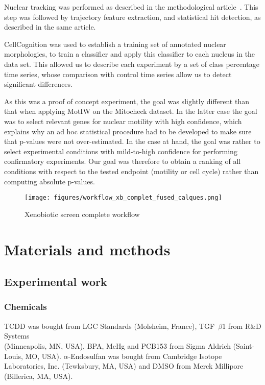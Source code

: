 Nuclear tracking was performed as described in the methodological article~\cite{motiw}. This step was followed by trajectory feature extraction, and statistical hit detection, as described in the same article.

CellCognition was used to establish a training set of annotated nuclear morphologies, to train a classifier and apply this classifier to each nucleus in the data set. This allowed us to describe each experiment by a set of class percentage time series, whose comparison with control time series allow us to detect significant differences.

As this was a proof of concept experiment, the goal was slightly different than that when applying MotIW on the Mitocheck dataset. In the latter case the goal was to select relevant genes for nuclear motility with high confidence, which explains why an ad hoc statistical procedure had to be developed to make sure that p-values were not over-estimated. In the case at hand, the goal was rather to select experimental conditions with mild-to-high confidence for performing confirmatory experiments. Our goal was therefore to obtain a ranking of all conditions with respect to the tested endpoint (motility or cell cycle) rather than computing absolute p-values.

\begin{figure}[!ht]
\centerline{\texttt{[image: figures/workflow\_xb\_complet\_fused\_calques.png]}}
\caption{Xenobiotic screen complete workflow}
\label{xbsc_workflow}
\end{figure}

\section{Materials and methods}
\label{protocoles}
\subsection{Experimental work}
\subsubsection{Chemicals}
TCDD was bought from LGC Standards (Molsheim, France), TGF~$\beta$1 from R\&D Systems\texttrademark \\ (Minneapolis, MN, USA), BPA, MeHg and PCB153 from Sigma Aldrich\up{\textregistered} (Saint-Louis, MO, USA). $\alpha$-Endosulfan was bought from Cambridge Isotope Laboratories, Inc. (Tewksbury, MA, USA) and DMSO from Merck Millipore (Billerica, MA, USA).

